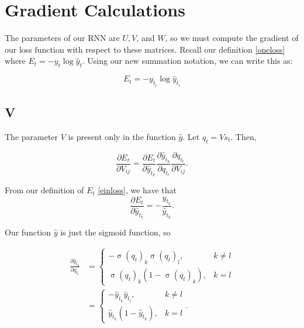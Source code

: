 \documentclass[11pt,twoside]{article}
\DeclareMathOperator{\sigmoid}{\sigma}
\begin{document}
\section{Gradient Calculations}
The parameters of our RNN are $U, V$, and $W$, so we must compute the gradient of our loss function with respect to these matrices. Recall our definition \eqref{oneloss} where $E_t=-y_t\log\hat{y}_t$. Using our new summation notation, we can write this as:

\begin{equation}
\label{einloss}
E_t=-y_{t_i}\log{\hat{y}_{t_i}}
\end{equation}

\subsection{V}
The parameter $V$ is present only in the function $\hat{y}$. Let $q_t=V s_t$. Then,

\begin{equation}
\frac{\partial E_t}{\partial V_{i j}}=\frac{\partial E_t}{\partial \hat{y}_{t_k}}\frac{\partial \hat{y}_{t_k}}{\partial q_{t_l}}\frac{\partial q_{t_l}}{\partial  V_{i j}}.
\end{equation}

\noindent From our definition of $E_t$ \eqref{einloss}, we have that 
\begin{equation}
\label{e8}
\frac{\partial E_t}{\partial \hat{y}_{t_k}}=-\frac{y_{t_k}}{\hat{y}_{t_k}}.
\end{equation}

\noindent Our function $\hat{y}$ is just the sigmoid function, so

\begin{subequations}
\begin{align}
\frac{\partial \hat{y}_{t_k}}{\partial q_{t_l}}&=\left\{
	\begin{array}{lr}
	-\sigmoid(q_t)_k\sigmoid(q_t)_l, & k\neq l \\
	\sigmoid(q_t)_k\left(1-\sigmoid(q_t)_k\right), & k=l
	\end{array}
	\right. \\
\label{e9}
&=\left\{
	\begin{array}{lr}
	-\hat{y}_{t_k}\hat{y}_{t_l}, & k\neq l \\
	\hat{y}_{t_k}\left(1-\hat{y}_{t_k}\right), & k=l
	\end{array}
	\right..
\end{align}
\end{subequations}
\end{document}
